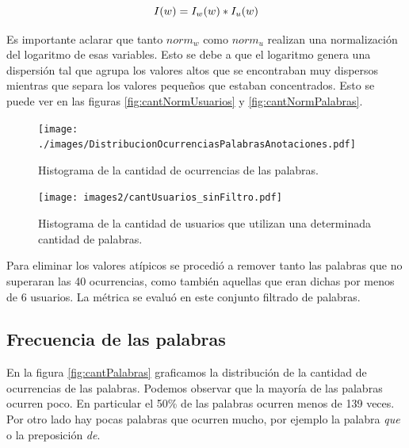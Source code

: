 \begin{equation}
I(w) =  I_w(w) * I_u(w)\\
\end{equation}

Es importante aclarar que tanto $norm_{w}$ como $norm_{u}$ realizan una normalización del logaritmo de esas variables. Esto se debe a que el logaritmo genera una dispersión tal que agrupa los valores altos que se encontraban muy dispersos mientras que separa los valores pequeños que estaban concentrados. Esto se puede ver en las figuras \ref{fig:cantNormUsuarios} y \ref{fig:cantNormPalabras}.



\begin{figure}[!ht]\centering
  \begin{minipage}[t]{0.49\textwidth}
    \texttt{[image: ./images/DistribucionOcurrenciasPalabrasAnotaciones.pdf]}
    \caption{Histograma de la cantidad de ocurrencias de las palabras.} 
    \label{fig:cantPalabras} 
   \end{minipage}
   \begin{minipage}[t]{0.49\textwidth}
    \texttt{[image: images2/cantUsuarios\_sinFiltro.pdf]}
    \caption{Histograma de la cantidad de usuarios que utilizan una determinada cantidad de palabras.} 
    \label{fig:cantPalabrasPromedio} 
   \end{minipage}
   
\end{figure}

Para eliminar los valores atípicos se procedió a remover tanto las palabras que no superaran las 40 ocurrencias, como también aquellas que eran dichas por menos de 6 usuarios. La métrica se evaluó en este conjunto filtrado de palabras. 

\subsection{Frecuencia de las palabras}
\label{sub: frecuenciaPalabras}
En la figura \ref{fig:cantPalabras} graficamos la distribución de la cantidad de ocurrencias de las palabras. Podemos observar que la mayoría de las palabras ocurren poco. En particular el 50\% de las palabras ocurren menos de 139 veces. Por otro lado hay pocas palabras que ocurren mucho, por ejemplo la palabra \textit{que} o la preposición \textit{de}.

